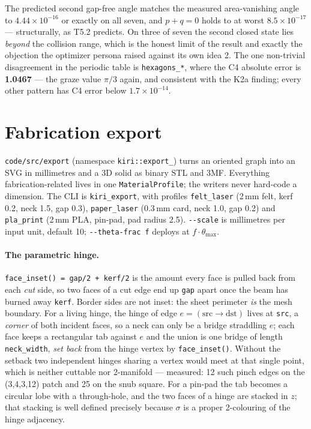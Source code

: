 \documentclass[10pt,a4paper]{article}
\newcommand{\fn}[1]{\nolinkurl{#1}}
\begin{document}
The predicted second gap-free angle matches the measured area-vanishing angle to
$4.44\times10^{-16}$ or exactly on all seven, and $p + q = 0$ holds to at worst
$8.5\times10^{-17}$ --- structurally, as T5.2 predicts. On three of seven the second closed state
lies \emph{beyond} the collision range, which is the honest limit of the result and exactly the
objection the optimizer persona raised against its own idea 2.
The one non-trivial disagreement in the periodic table is \fn{hexagons_*}, where the C4 absolute
error is \textbf{1.0467} --- the graze value $\pi/3$ again, and consistent with the K2a finding;
every other pattern has C4 error below $1.7\times10^{-14}$.

\section{Fabrication export}

\fn{code/src/export} (namespace \fn{kiri::export_}) turns an oriented graph into an SVG in
millimetres and a 3D solid as binary STL and 3MF. Everything fabrication-related lives in one
\fn{MaterialProfile}; the writers never hard-code a dimension. The CLI is
\fn{kiri_export}, with profiles \fn{felt_laser} (2\,mm felt, kerf 0.2, neck 1.5, gap 0.3),
\fn{paper_laser} (0.3\,mm card, neck 1.0, gap 0.2) and \fn{pla_print} (2\,mm PLA, pin-pad, pad
radius 2.5). \fn{--scale} is millimetres per input unit, default 10; \fn{--theta-frac f}
deploys at $f\cdot\theta_{\max}$.

\paragraph{The parametric hinge.} \fn{face_inset() = gap/2 + kerf/2} is the amount every face is
pulled back from each \emph{cut} side, so two faces of a cut edge end up \fn{gap} apart once the
beam has burned away \fn{kerf}. Border sides are not inset: the sheet perimeter \emph{is} the
mesh boundary. For a living hinge, the hinge of edge $e = (\mathrm{src}\to\mathrm{dst})$ lives
at \fn{src}, a \emph{corner} of both incident faces, so a neck can only be a bridge straddling
$e$; each face keeps a rectangular tab against $e$ and the union is one bridge of length
\fn{neck_width}, \emph{set back} from the hinge vertex by \fn{face_inset()}. Without the setback
two independent hinges sharing a vertex would meet at that single point, which is neither
cuttable nor 2-manifold --- measured: 12 such pinch edges on the (3,4,3,12) patch and 25 on the
snub square. For a pin-pad the tab becomes a circular lobe with a through-hole, and the two
faces of a hinge are stacked in $z$; that stacking is well defined precisely because $\sigma$ is
a proper 2-colouring of the hinge adjacency.
\end{document}
